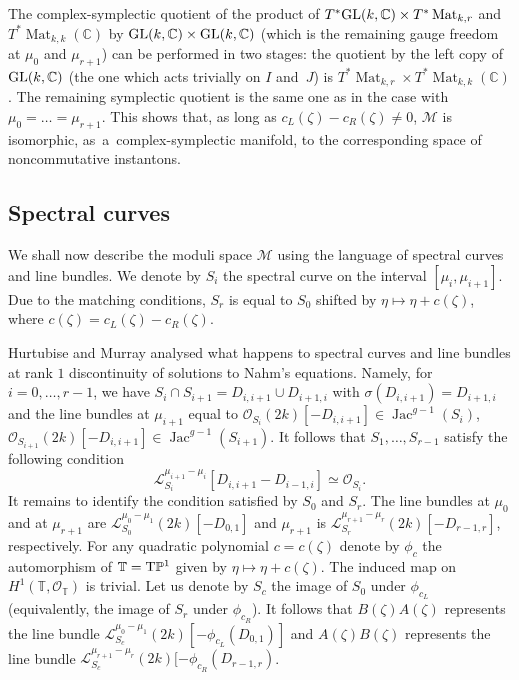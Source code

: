 \documentclass[10pt,a4paper]{amsart}
\newcommand{\cx}{{\mathbb C}}
\newcommand{\Jac}{\operatorname{Jac}}
\newcommand{\Mat}{\operatorname{Mat}}
\numberwithin{equation}{section}
\newcommand{\oP}{{\mathbb{P}}}
\newcommand{\oT}{{\mathbb{T}}}
\newcommand{\sM}{{\mathcal{M}}} %
\newcommand{\sO}{{\mathcal{O}}}
\begin{document}
{The complex-symplectic quotient of the product of $T^\ast {\rm GL}(k,\cx)\times T^\ast\Mat_{k,r}$ and $T^\ast \Mat_{k,k}(\cx)$ by ${\rm GL}(k,\cx)\times {\rm GL}(k,\cx)$ (which is the remaining gauge freedom at $\mu_0$ and $\mu_{r+1}$)
 can be performed in two stages: the quotient by the left copy of ${\rm GL}(k,\cx)$ (the one which acts trivially on $I$ and~$J$) is $T^\ast\Mat_{k,r}\times T^\ast \Mat_{k,k}(\cx)$.
The remaining symplectic quotient is the
same one as in the case with
$\mu_0=\dots=\mu_{r+1}$. This shows that, as long as $c_L(\zeta)-c_R(\zeta)\neq 0$, $\sM$ is isomorphic, as~a~complex-symplectic manifold,
to the corresponding space of noncommutative instantons.

\subsection{Spectral curves}
We shall now describe the moduli space $\sM$ using the language of spectral curves and line bundles.
 We denote by $S_i$ the spectral curve on the interval $[\mu_{i},\mu_{i+1}]$. Due to the matching conditions, $S_{r}$ is equal to $S_0$ shifted by $\eta\mapsto \eta+ c(\zeta)$, where $c(\zeta)=c_L(\zeta)-c_R(\zeta)$.
\par
Hurtubise and Murray \cite{HM} analysed what happens to spectral curves and line bundles at rank $1$ {discontinuity} of solutions to Nahm's equations. Namely, for $i=0,\dots,r-1$, we have $S_i\cap S_{i+1}=D_{i,i+1}\cup D_{i+1,i}$ with $\sigma(D_{i,i+1})=D_{i+1,i}$ and the line bundles at $\mu_{i+1}$ equal to $\sO_{S_i}(2k)[-D_{i,i+1}]\in \Jac^{g-1}(S_i)$, $\sO_{S_{i+1}}(2k)[-D_{i,i+1}]\in \Jac^{g-1}(S_{i+1})$. It follows that $S_1,\dots,S_{r-1}$ satisfy the following condition
\begin{equation} \mathscr{L}_{S_i}^{\mu_{i+1}-\mu_{i}}[D_{i,i+1}-D_{i-1,i}]\simeq \sO_{S_i}.\label{triviality}
\end{equation}
It remains to identify the condition satisfied by $S_0$ and $S_{r}$. The line bundles at $\mu_0$ and
at $\mu_{r+1}$ are
 $\mathscr{L}_{S_0}^{\mu_0-\mu_1}(2k)[-D_{0,1}]$  and $\mu_{r+1}$ is $\mathscr{L}_{S_{r}}^{\mu_{r+1}-\mu_r}(2k)[-D_{r-1,r}]$, respectively.
 For any quadratic polynomial $c=c(\zeta)$ denote by $\phi_c$ the automorphism of $\oT={\rm T}\oP^1$ given by $\eta\mapsto \eta+ c(\zeta)$. The induced map on $H^1(\oT,\sO_{\oT})$ is trivial. Let us denote by $S_c$ the image of $S_0$ under $\phi_{c_L}$ (equivalently, the image of $S_{r}$ under $\phi_{c_R}$). It follows that $B(\zeta)A(\zeta)$ represents the line bundle $\mathscr{L}_{S_c}^{\mu_0-\mu_1}(2k)[-\phi_{c_L}(D_{0,1})]$ and $A(\zeta)B(\zeta)$ represents the line bundle $\mathscr{L}_{S_c}^{\mu_{r+1}-\mu_r}(2k)[-\phi_{c_R}(D_{r-1,r})$.
}
\end{document}
